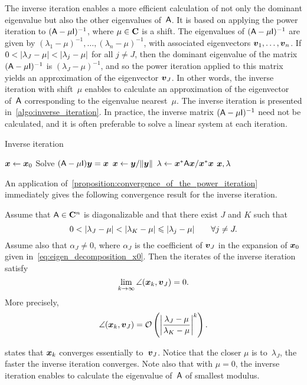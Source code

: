 The inverse iteration enables a more efficient calculation of not only the dominant eigenvalue
but also the other eigenvalues of~$\mat A$.
It is based on applying the power iteration to $(\mat A - \mu \mat I)^{-1}$,
where $\mu \in \complex$ is a shift.
The eigenvalues of $(\mat A - \mu \mat I)^{-1}$ are given by $(\lambda_1 - \mu)^{-1}, \dotsc, (\lambda_n - \mu)^{-1}$,
with associated eigenvectors $\vect v_1, \dotsc, \vect v_n$.
If $0 < \abs{\lambda_J - \mu} < \abs{\lambda_j - \mu}$ for all $j \neq J$,
then the dominant eigenvalue of the matrix $(\mat A - \mu \mat I)^{-1}$ is $(\lambda_J - \mu)^{-1}$,
and so the power iteration applied to this matrix yields an approximation of the eigenvector $\vect v_J$.
In other words,
the inverse iteration with shift~$\mu$ enables to calculate an approximation of the eigenvector of~$\mat A$ corresponding to the eigenvalue nearest~$\mu$.
The inverse iteration is presented in~\cref{algo:inverse_iteration}.
In practice, the inverse matrix $(\mat A - \mu \mat I)^{-1}$ need not be calculated,
and it is often preferable to solve a linear system at each iteration.
\begin{algorithm}
\caption{Inverse iteration}%
\label{algo:inverse_iteration}%
\begin{algorithmic}
\State $\vect x \gets \vect x_0$
    \State Solve $(\mat A - \mu \mat I) \vect y = \vect x$
    \State $\vect x \gets \vect y / \norm{\vect y}$
\EndFor
\State $\lambda \gets \vect x^* \mat A \vect x / \vect x^* \vect x$
\State \Return $\vect x, \lambda$
\end{algorithmic}
\end{algorithm}

An application of~\cref{proposition:convergence_of_the_power_iteration} immediately gives the following convergence result for the inverse iteration.
\begin{proposition}
    \label{proposition:inverse_iteration}
    Assume that $\mat A \in \complex^n$ is diagonalizable
    and that there exist $J$ and $K$ such that
    \[
        0 < \abs{\lambda_J - \mu} < \abs{\lambda_K - \mu} \leq \abs{\lambda_j - \mu} \qquad \forall j \neq J.
    \]
    Assume also that $\alpha_J \neq 0$,
    where $\alpha_J$ is the coefficient of $\vect v_J$ in the expansion of $\vect x_0$ given in~\eqref{eq:eigen_decomposition_x0}.
    Then the iterates of the inverse iteration satisfy
    \[
        \lim_{k \to \infty} \angle(\vect x_k, \vect v_J) = 0.
    \]
    More precisely,
    \[
        \angle(\vect x_k, \vect v_J) = \bigo \left( \abs*{\frac{\lambda_J - \mu}{\lambda_K - \mu}}^k \right).
    \]
\end{proposition}
 states that $\vect x_k$ converges essentially to~$\vect v_J$.
Notice that the closer $\mu$ is to~$\lambda_J$,
the faster the inverse iteration converges.
Note also that with $\mu = 0$,
the inverse iteration enables to calculate the eigenvalue of~$\mat A$ of smallest modulus.

